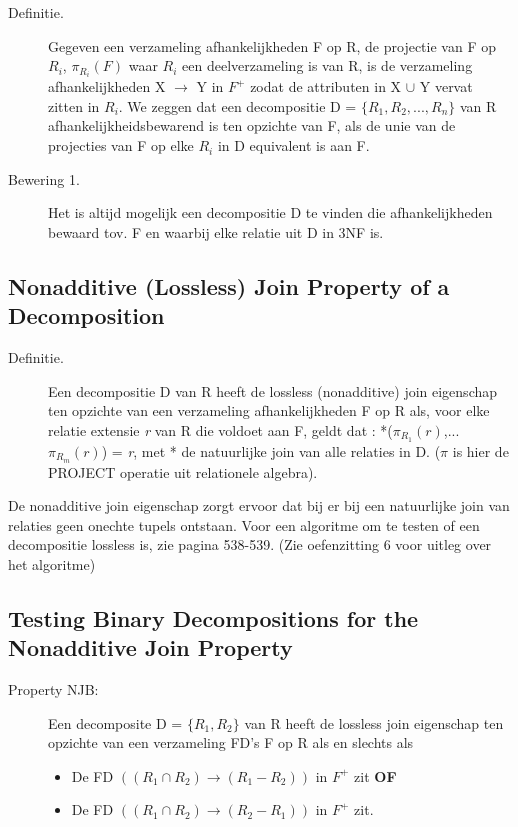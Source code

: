 					\begin{description}
						\item[Definitie. ] Gegeven een verzameling afhankelijkheden F op R, de projectie van F op $R_i$, $\pi_{R_i}(F)$ waar $R_i$ een deelverzameling is van R, is de 									verzameling afhankelijkheden X $\rightarrow$ Y in $F^+$ zodat de attributen in X $\cup$ Y vervat zitten in $R_i$. We zeggen dat een decompositie D = $\lbrace R_1, 								R_2, ..., R_n \rbrace$ van R afhankelijkheidsbewarend is ten opzichte van F, als de unie van de projecties van F op elke $R_i$ in D equivalent is aan F. 
					\end{description}
					
					\begin{description}
						\item[Bewering 1. ] Het is altijd mogelijk een decompositie D te vinden die afhankelijkheden bewaard tov. F en waarbij elke relatie uit D in 3NF is.
					\end{description}
					
				\subsection{Nonadditive (Lossless) Join Property of a Decomposition}
				
					\begin{description}
						\item[Definitie. ] Een decompositie D van R heeft de lossless (nonadditive) join eigenschap ten opzichte van een verzameling afhankelijkheden F op R als, voor elke 							relatie extensie \textit{r} van R die voldoet aan F, geldt dat : *($\pi_{R_1}(r)$,...$\pi_{R_m}(r)$) = \textit{r}, met * de natuurlijke join van alle relaties in D. 						($\pi$ is hier de PROJECT operatie uit relationele algebra).
					\end{description}
					
					De nonadditive join eigenschap zorgt ervoor dat bij er bij een natuurlijke join van relaties geen onechte tupels ontstaan. Voor een algoritme om te testen of een 								decompositie lossless is, zie pagina 538-539. (Zie oefenzitting 6 voor uitleg over het algoritme)
					
				\subsection{Testing Binary Decompositions for the Nonadditive Join Property}
					
					\begin{description}
						\item[Property NJB: ] Een decomposite D = $\lbrace R_1, R_2 \rbrace$ van R heeft de lossless join eigenschap ten opzichte van een verzameling FD's F op R als en 								slechts als 
						\begin{itemize}
							\item De FD $((R_1 \cap R_2) \rightarrow (R_1 - R_2))$ in $F^+$ zit \textbf{OF}
							\item De FD $((R_1 \cap R_2) \rightarrow (R_2 - R_1))$ in $F^+$ zit.
						\end{itemize}
					\end{description}
					
